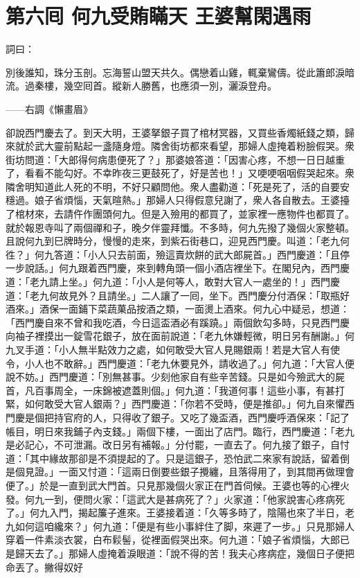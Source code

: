 
\chapter*{第六囘 何九受賄瞞天 王婆幫閑遇雨}


詞曰：

別後誰知，珠分玉剖。忘海誓山盟天共久。偶戀着山雞，輒棄鸞儔。從此簫郎淚暗流。過秦樓，幾空囘首。縱新人勝舊，也應須一別，灑淚登舟。

——右調《懶畫眉》

卻說西門慶去了。到天大明，王婆拏銀子買了棺材冥器，又買些香燭紙錢之類，歸來就於武大靈前點起一盞隨身燈。隣舍街坊都來看望，那婦人虛掩着粉臉假哭。衆街坊問道：「大郎得何病患便死了？」那婆娘答道：「因害心疼，不想一日日越重了，看看不能勾好。不幸昨夜三更鼓死了，好是苦也！」又哽哽咽咽假哭起來。衆隣舍明知道此人死的不明，不好只顧問他。衆人盡勸道：「死是死了，活的自要安穩過。娘子省煩惱，天氣暄熱。」那婦人只得假意兒謝了，衆人各自散去。王婆擡了棺材來，去請仵作團頭何九。但是入殮用的都買了，並家裡一應物件也都買了。就於報恩寺叫了兩個禪和子，晚夕伴靈拜懺。不多時，何九先撥了幾個火家整頓。且說何九到巳牌時分，慢慢的走來，到紫石街巷口，迎見西門慶。叫道：「老九何徃？」何九答道：「小人只去前面，殮這賣炊餅的武大郎屍首。」西門慶道：「且停一步說話。」何九跟着西門慶，來到轉角頭一個小酒店裡坐下。在閣兒內，西門慶道：「老九請上坐。」何九道：「小人是何等人，敢對大官人一處坐的！」西門慶道：「老九何故見外？且請坐。」二人讓了一囘，坐下。西門慶分付酒保：「取瓶好酒來。」酒保一面鋪下菜蔬菓品按酒之類，一面燙上酒來。何九心中疑忌，想道：「西門慶自來不曾和我吃酒，今日這盃酒必有蹊蹺。」兩個飲勾多時，只見西門慶向袖子裡摸出一錠雪花銀子，放在面前說道：「老九休嫌輕微，明日另有酬謝。」何九叉手道：「小人無半點效力之處，如何敢受大官人見賜銀兩！若是大官人有使令，小人也不敢辭。」西門慶道：「老九休要見外，請收過了。」何九道：「大官人便說不妨。」西門慶道：「別無甚事。少刻他家自有些辛苦錢。只是如今殮武大的屍首，凡百事周全，一床錦被遮蓋則個。」何九道：「我道何事！這些小事，有甚打緊，如何敢受大官人銀兩？」西門慶道：「你若不受時，便是推卻。」何九自來懼西門慶是個把持官府的人，只得收了銀子。又吃了幾盃酒，西門慶呼酒保來：「記了帳目，明日來我鋪子內支錢。」兩個下樓，一面出了店門。臨行，西門慶道：「老九是必記心，不可泄漏。改日另有補報。」{}分付罷，一直去了。何九接了銀子，自忖道：「其中緣故那卻是不須提起的了。只是這銀子，恐怕武二來家有說話，留着倒是個見證。」一面又忖道：「這兩日倒要些銀子攪纏，且落得用了，到其間再做理會便了。」於是一直到武大門首。只見那幾個火家正在門首伺候。王婆也等的心裡火發。何九一到，便問火家：「這武大是甚病死了？」火家道：「他家說害心疼病死了。」何九入門，揭起簾子進來。王婆接着道：「久等多時了，陰陽也來了半日，老九如何這咱纔來？」何九道：「便是有些小事絆住了脚，來遲了一步。」只見那婦人穿着一件素淡衣裳，白布鬏髻，從裡面假哭出來。何九道：「娘子省煩惱，大郎已是歸天去了。」那婦人虛掩着淚眼道：「說不得的苦！我夫心疼病症，幾個日子便把命丟了。撇得奴好